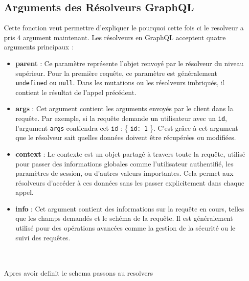 \documentclass{article}
\begin{document}
\subsection{Arguments des Résolveurs GraphQL }
Cette fonction veut permettre d'expliquer le pourquoi cette fois ci le resolveur a pris 4 argument maintenant.
Les résolveurs en GraphQL acceptent quatre arguments principaux :

\begin{itemize}
    \item \textbf{parent} : 
    Ce paramètre représente l'objet renvoyé par le résolveur du niveau supérieur. Pour la première requête, ce paramètre est généralement \texttt{undefined} ou \texttt{null}. Dans les mutations ou les résolveurs imbriqués, il contient le résultat de l'appel précédent.
    
    \item \textbf{args} : 
    Cet argument contient les arguments envoyés par le client dans la requête. Par exemple, si la requête demande un utilisateur avec un \texttt{id}, l'argument \texttt{args} contiendra cet \texttt{id} : \{ \texttt{id: 1} \}. C'est grâce à cet argument que le résolveur sait quelles données doivent être récupérées ou modifiées.
    
    \item \textbf{context} : 
    Le contexte est un objet partagé à travers toute la requête, utilisé pour passer des informations globales comme l'utilisateur authentifié, les paramètres de session, ou d'autres valeurs importantes. Cela permet aux résolveurs d'accéder à ces données sans les passer explicitement dans chaque appel.
    
    \item \textbf{info} : 
    Cet argument contient des informations sur la requête en cours, telles que les champs demandés et le schéma de la requête. Il est généralement utilisé pour des opérations avancées comme la gestion de la sécurité ou le suivi des requêtes.
\end{itemize}\\\\
Apres avoir definit le schema passons au resolvers\\\\
\end{document}
